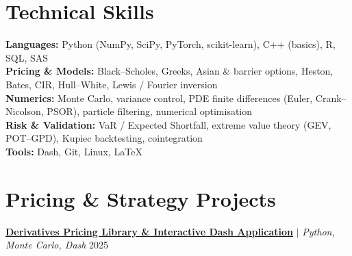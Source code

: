 




\section{Technical Skills}
\begin{itemize}[leftmargin=0.15in, label={}]
  \small{\item{
    \textbf{Languages:} Python (NumPy, SciPy, PyTorch, scikit-learn), C++ (basics), R, SQL, SAS \\
    \textbf{Pricing \& Models:} Black--Scholes, Greeks, Asian \& barrier options, Heston, Bates, CIR, Hull--White, Lewis / Fourier inversion \\
    \textbf{Numerics:} Monte Carlo, variance control, PDE finite differences (Euler, Crank--Nicolson, PSOR), particle filtering, numerical optimisation \\
    \textbf{Risk \& Validation:} VaR / Expected Shortfall, extreme value theory (GEV, POT--GPD), Kupiec backtesting, cointegration \\
    \textbf{Tools:} Dash, Git, Linux, \LaTeX
  }}
\end{itemize}

\section{Pricing \& Strategy Projects}
\resumeSubHeadingListStart

  \resumeProjectHeading
    {\href{https://usenamefd.github.io/projects/bibliotheque-pricing-dash.html}{\textbf{Derivatives Pricing Library \& Interactive Dash Application}} $|$ \emph{Python, Monte Carlo, Dash}} {2025}
    \resumeItemListStart
    \resumeItemListEnd

